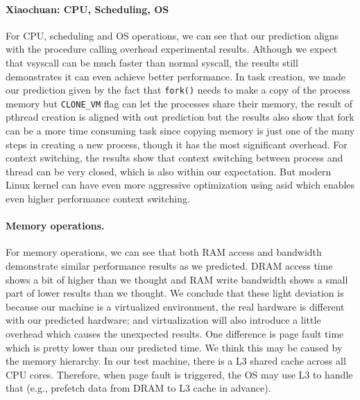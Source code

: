\paragraph{Xiaochuan: CPU, Scheduling, OS} For CPU, scheduling and OS operations, we can see that our prediction aligns with the procedure calling overhead experimental results. Although we expect that vsyscall can be much faster than normal syscall, the results still demonstrates it can even achieve better performance. In task creation, we made our prediction given by the fact that \texttt{fork()} needs to make a copy of the process memory but \texttt{CLONE\_VM} flag can let the processes share their memory, the result of pthread creation is aligned with out prediction but the results also show that fork can be a more time consuming task since copying memory is just one of the many steps in creating a new process, though it has the most significant overhead. For context switching, the results show that context switching between process and thread can be very closed, which is also within our expectation. But modern Linux kernel can have even more aggressive optimization using asid which enables even higher performance context switching. 

\paragraph{Memory operations.} For memory operations, we can see that both RAM access and bandwidth demonstrate similar performance results as we predicted. DRAM access time shows a bit of higher than we thought and RAM write bandwidth shows a small part of lower results than we thought. We conclude that these light deviation is because our machine is a virtualized environment, the real hardware is different with our predicted hardware; and virtualization will also introduce a little overhead which causes the unexpected results. One difference is page fault time which is pretty lower than our predicted time. We think this may be caused by the memory hierarchy. In our test machine, there is a L3 shared cache across all CPU cores. Therefore, when page fault is triggered, the OS may use L3 to handle that (e.g., prefetch data from DRAM to L3 cache in advance). 

